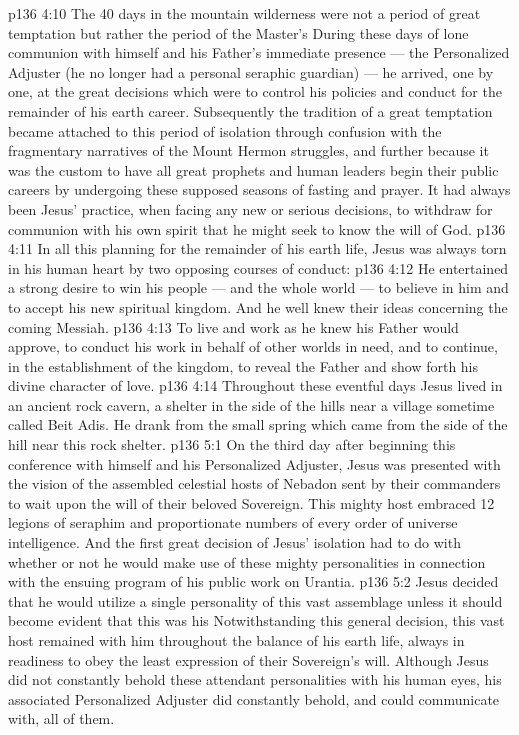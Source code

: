 \vs p136 4:10 \pc The 40 days in the mountain wilderness were not a period of great temptation but rather the period of the Master’s  During these days of lone communion with himself and his Father’s immediate presence --- the Personalized Adjuster (he no longer had a personal seraphic guardian) --- he arrived, one by one, at the great decisions which were to control his policies and conduct for the remainder of his earth career. Subsequently the tradition of a great temptation became attached to this period of isolation through confusion with the fragmentary narratives of the Mount Hermon struggles, and further because it was the custom to have all great prophets and human leaders begin their public careers by undergoing these supposed seasons of fasting and prayer. It had always been Jesus’ practice, when facing any new or serious decisions, to withdraw for communion with his own spirit that he might seek to know the will of God.
\vs p136 4:11 \pc In all this planning for the remainder of his earth life, Jesus was always torn in his human heart by two opposing courses of conduct:
\vs p136 4:12 \bibnobreakspace He entertained a strong desire to win his people --- and the whole world --- to believe in him and to accept his new spiritual kingdom. And he well knew their ideas concerning the coming Messiah.
\vs p136 4:13 \bibnobreakspace To live and work as he knew his Father would approve, to conduct his work in behalf of other worlds in need, and to continue, in the establishment of the kingdom, to reveal the Father and show forth his divine character of love.
\vs p136 4:14 \pc Throughout these eventful days Jesus lived in an ancient rock cavern, a shelter in the side of the hills near a village sometime called Beit Adis. He drank from the small spring which came from the side of the hill near this rock shelter.
\vs p136 5:1 On the third day after beginning this conference with himself and his Personalized Adjuster, Jesus was presented with the vision of the assembled celestial hosts of Nebadon sent by their commanders to wait upon the will of their beloved Sovereign. This mighty host embraced 12 legions of seraphim and proportionate numbers of every order of universe intelligence. And the first great decision of Jesus’ isolation had to do with whether or not he would make use of these mighty personalities in connection with the ensuing program of his public work on Urantia.
\vs p136 5:2 Jesus decided that he would  utilize a single personality of this vast assemblage unless it should become evident that this was his  Notwithstanding this general decision, this vast host remained with him throughout the balance of his earth life, always in readiness to obey the least expression of their Sovereign’s will. Although Jesus did not constantly behold these attendant personalities with his human eyes, his associated Personalized Adjuster did constantly behold, and could communicate with, all of them.
